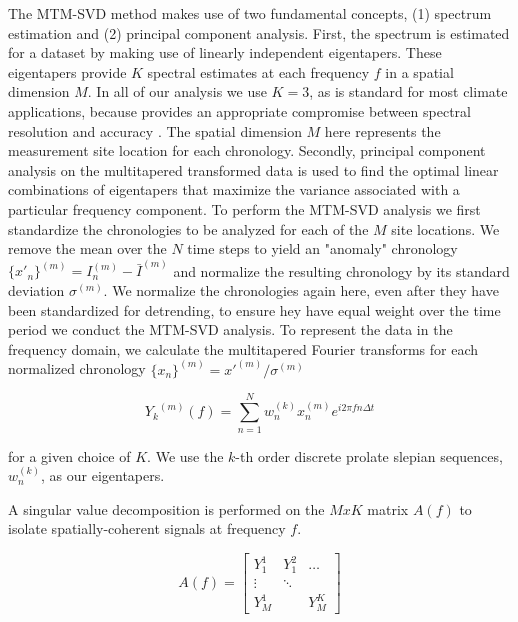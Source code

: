 \documentclass[phd,tocprelim]{cornell}
\begin{document}
The MTM-SVD method makes use of two fundamental concepts, (1) spectrum 
estimation and (2) principal component analysis. First, the spectrum 
is estimated for a dataset by making use of linearly independent 
eigentapers. These eigentapers provide $K$ spectral estimates at each 
frequency $f$ in a spatial dimension $M$. In all of our analysis we use $K=3$, 
as is standard for most climate applications, because provides an appropriate 
compromise between spectral resolution and accuracy \cite{mann1999oscillatory}.
The spatial dimension $M$ here represents the measurement site location 
for each chronology. Secondly, principal component analysis on the 
multitapered transformed data is used to find the optimal linear 
combinations of eigentapers that maximize the variance associated with 
a particular frequency component. To perform the MTM-SVD analysis we 
first standardize the chronologies to be analyzed for each of the 
$M$ site locations. We remove the mean over the $N$ time steps to 
yield an "anomaly" chronology $\{{x'}_{n}\}^{(m)} = I_n^{(m)}-\bar{I}^{(m)}$ 
and normalize the resulting chronology by its standard deviation 
$\sigma^{(m)}$. We normalize the chronologies again here, even after 
they have been standardized for detrending, to ensure hey have equal 
weight over the time period we conduct the MTM-SVD analysis. To 
represent the data in the frequency domain, we calculate the multitapered 
Fourier transforms for each normalized chronology 
$\{x_{n}\}^{(m)}={x'}^{(m)}/{\sigma^{(m)}}$

\begin{equation}
    {Y_{k}}^{(m)}(f) = \sum_{n=1}^{N} w_{n}^{(k)} x_{n}^{(m)} e^{i2\pi fn \Delta t}
\end{equation}

for a given choice of $K$. We use the $k$-th order discrete prolate 
slepian sequences, $w_{n}^{(k)}$, as our eigentapers. 

A singular value decomposition is performed on the $M x K$ matrix $A(f)$ 
to isolate spatially-coherent signals at frequency $f$.

\begin{equation}
    A(f) = 
       \begin{bmatrix} 
       Y_{1}^{1} & Y_{1}^{2} & \dots \\
          \vdots & \ddots & \\
       Y_{M}^{1} &        & Y_{M}^{K} 
       \end{bmatrix}
\label{Amat}       
\end{equation}
\end{document}
